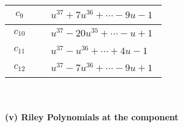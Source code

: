 \documentclass[1p]{elsarticle_modified}
\theoremstyle{definition}
\begin{document}
\begin{tabular}{m{50pt}|m{274pt}}
\hline $$\begin{aligned}c_{9}\end{aligned}$$&$\begin{aligned}
&u^{37}+7 u^{36}+\cdots-9 u-1
\end{aligned}$\\
\hline $$\begin{aligned}c_{10}\end{aligned}$$&$\begin{aligned}
&u^{37}-20 u^{35}+\cdots- u+1
\end{aligned}$\\
\hline $$\begin{aligned}c_{11}\end{aligned}$$&$\begin{aligned}
&u^{37}- u^{36}+\cdots+4 u-1
\end{aligned}$\\
\hline $$\begin{aligned}c_{12}\end{aligned}$$&$\begin{aligned}
&u^{37}-7 u^{36}+\cdots-9 u+1
\end{aligned}$\\
\hline
\end{tabular}\\~\\
\newpage\renewcommand{\arraystretch}{1}
\flushleft \textbf{(v) Riley Polynomials at the component}\newline \\
\end{document}
